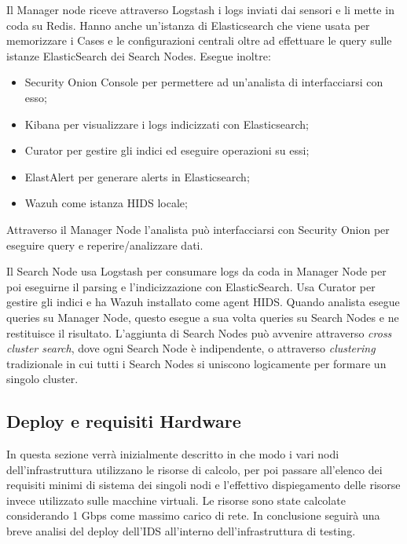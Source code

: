 \vspace{5mm}
Il Manager node riceve attraverso Logstash i logs  inviati dai sensori e li mette in coda su Redis.
Hanno anche un'istanza di Elasticsearch che viene usata per memorizzare i Cases e le configurazioni centrali oltre ad effettuare le query sulle istanze ElasticSearch dei Search Nodes.
Esegue inoltre:
\begin{itemize}
    \item Security Onion Console per permettere ad un'analista di interfacciarsi con esso;
    \item Kibana per visualizzare  i logs indicizzati con Elasticsearch;
    \item Curator per gestire gli indici ed eseguire operazioni su essi;
    \item ElastAlert per generare alerts  in Elasticsearch;
    \item Wazuh come istanza HIDS locale;
\end{itemize}
Attraverso il Manager Node l'analista può interfacciarsi con Security Onion per eseguire query e reperire/analizzare dati.

\vspace{5mm}
Il Search Node usa Logstash per consumare logs da coda in Manager Node per poi eseguirne il parsing e l'indicizzazione con ElasticSearch. Usa Curator per gestire gli indici e ha Wazuh installato come agent HIDS. Quando analista esegue queries su Manager Node, questo esegue a sua volta queries su Search Nodes e ne restituisce il risultato.
L'aggiunta di Search Nodes può avvenire attraverso \textit{cross cluster search}, dove ogni Search Node è indipendente, o attraverso \textit{clustering} tradizionale in cui tutti i Search Nodes si uniscono logicamente per formare un singolo cluster.

\subsection{Deploy e requisiti Hardware}
In questa sezione verrà inizialmente descritto in che modo i vari nodi dell'infrastruttura utilizzano le risorse di calcolo, per poi passare all'elenco dei requisiti minimi di sistema \cite{securityOnionRequirements} dei singoli nodi e l'effettivo dispiegamento delle risorse invece utilizzato sulle macchine virtuali.
Le risorse sono state calcolate considerando 1 Gbps come massimo carico di rete.
In conclusione seguirà una breve analisi del  deploy dell'IDS all'interno dell'infrastruttura di testing.


